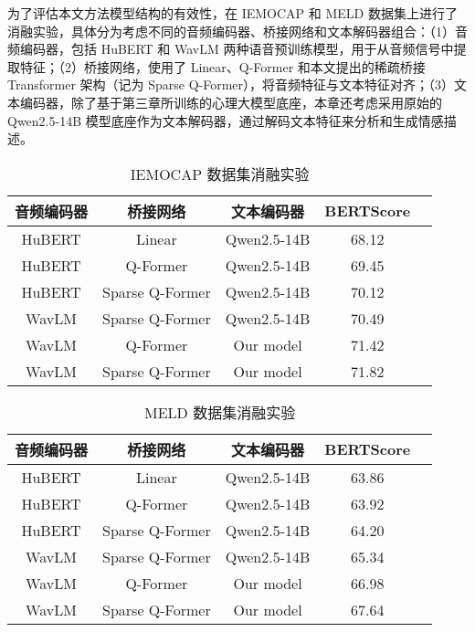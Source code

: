 为了评估本文方法模型结构的有效性，在 IEMOCAP 和 MELD 数据集上进行了消融实验，具体分为考虑不同的音频编码器、桥接网络和文本解码器组合：（1）音频编码器，包括 HuBERT 和 WavLM 两种语音预训练模型，用于从音频信号中提取特征；（2）桥接网络，使用了 Linear、Q-Former 和本文提出的稀疏桥接 Transformer 架构（记为 Sparse Q-Former），将音频特征与文本特征对齐；（3）文本编码器，除了基于第三章所训练的心理大模型底座，本章还考虑采用原始的 Qwen2.5-14B 模型底座作为文本解码器，通过解码文本特征来分析和生成情感描述。

\begin{table}
  \centering
  \caption{IEMOCAP 数据集消融实验}
  \label{tab:IEMOCAP 消融实验}
  \begin{tabular}{ccccc}
      \toprule
      音频编码器 & 桥接网络 & 文本编码器 & BERTScore \\
      \midrule
      HuBERT & Linear & Qwen2.5-14B & 68.12 \\
      HuBERT & Q-Former & Qwen2.5-14B & 69.45 \\
      HuBERT & Sparse Q-Former & Qwen2.5-14B & 70.12 \\
      WavLM & Sparse Q-Former & Qwen2.5-14B & 70.49 \\
      WavLM & Q-Former & Our model & 71.42 \\
      WavLM & Sparse Q-Former & Our model & 71.82 \\
      \bottomrule
  \end{tabular}
\end{table}

\begin{table}
  \centering
  \caption{MELD 数据集消融实验}
  \label{tab:MELD 消融实验}
  \begin{tabular}{ccccc}
      \toprule
      音频编码器 & 桥接网络 & 文本编码器 & BERTScore \\
      \midrule
      HuBERT & Linear & Qwen2.5-14B & 63.86 \\
      HuBERT & Q-Former & Qwen2.5-14B & 63.92 \\
      HuBERT & Sparse Q-Former & Qwen2.5-14B & 64.20 \\
      WavLM & Sparse Q-Former & Qwen2.5-14B & 65.34 \\
      WavLM & Q-Former & Our model & 66.98 \\
      WavLM & Sparse Q-Former & Our model & 67.64 \\
      \bottomrule
  \end{tabular}
\end{table}

